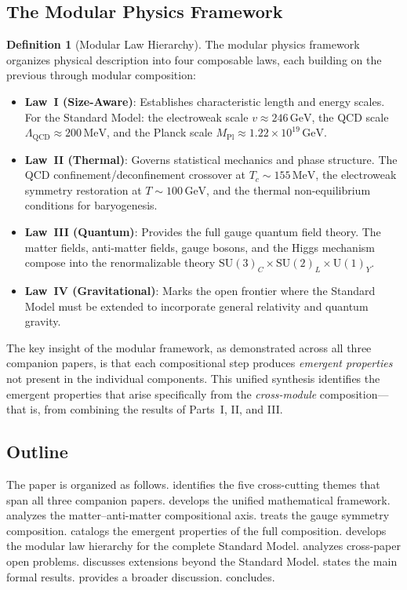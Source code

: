 \documentclass[12pt]{article}
\theoremstyle{definition}
\newtheorem{definition}[theorem]{Definition}
\theoremstyle{remark}
\newcommand{\GeV}{\,\mathrm{GeV}}
\newcommand{\MeV}{\,\mathrm{MeV}}
\newcommand{\su}[1]{\mathrm{SU}(#1)}
\newcommand{\uu}[1]{\mathrm{U}(#1)}
\newcommand{\Mpl}{M_{\mathrm{Pl}}}
\begin{document}
\subsection{The Modular Physics Framework}

\begin{definition}[Modular Law Hierarchy]
\label{def:modularhierarchy}
The modular physics framework organizes physical description into four composable laws, each building on the previous through modular composition:
\begin{itemize}
    \item \textbf{Law~I (Size-Aware)}: Establishes characteristic length and energy scales. For the Standard Model: the electroweak scale $v \approx 246\GeV$, the QCD scale $\Lambda_{\mathrm{QCD}} \approx 200\MeV$, and the Planck scale $\Mpl \approx 1.22 \times 10^{19}\GeV$.
    \item \textbf{Law~II (Thermal)}: Governs statistical mechanics and phase structure. The QCD confinement/deconfinement crossover at $T_c \sim 155\MeV$, the electroweak symmetry restoration at $T \sim 100\GeV$, and the thermal non-equilibrium conditions for baryogenesis.
    \item \textbf{Law~III (Quantum)}: Provides the full gauge quantum field theory. The matter fields, anti-matter fields, gauge bosons, and the Higgs mechanism compose into the renormalizable theory $\su{3}_C \times \su{2}_L \times \uu{1}_Y$.
    \item \textbf{Law~IV (Gravitational)}: Marks the open frontier where the Standard Model must be extended to incorporate general relativity and quantum gravity.
\end{itemize}
\end{definition}

The key insight of the modular framework, as demonstrated across all three companion papers, is that each compositional step produces \emph{emergent properties} not present in the individual components. This unified synthesis identifies the emergent properties that arise specifically from the \emph{cross-module} composition---that is, from combining the results of Parts~I, II, and III.

\subsection{Outline}

The paper is organized as follows.  identifies the five cross-cutting themes that span all three companion papers.  develops the unified mathematical framework.  analyzes the matter--anti-matter compositional axis.  treats the gauge symmetry composition.  catalogs the emergent properties of the full composition.  develops the modular law hierarchy for the complete Standard Model.  analyzes cross-paper open problems.  discusses extensions beyond the Standard Model.  states the main formal results.  provides a broader discussion.  concludes.
\end{document}
